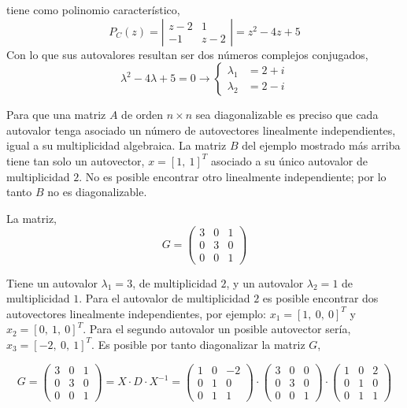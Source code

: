 tiene como polinomio característico,
\begin{equation*}
P_C(z)=\left\vert\begin{matrix}
z-2& 1\\
-1& z-2 
\end{matrix} \right\vert=z^2-4z+5
\end{equation*}
Con lo que sus autovalores resultan ser dos números complejos conjugados,
\begin{equation*}
\lambda^2-4\lambda+5=0 \rightarrow \left\{ 
\begin{aligned}
\lambda_1&=2+i\\
\lambda_2&=2-i
\end{aligned}
\right.
\end{equation*}

Para que una matriz $A$ de orden $n\times n$ sea diagonalizable es preciso que cada autovalor tenga asociado un número de autovectores linealmente independientes, igual a su multiplicidad algebraica. La matriz $B$ del ejemplo mostrado más arriba tiene tan solo un autovector, $x=[1,\ 1]^T$ asociado a su único autovalor de multiplicidad $2$. No es posible encontrar otro linealmente independiente; por lo tanto $B$ no es diagonalizable. 

La matriz, 
\begin{equation*}
G=\begin{pmatrix}
3& 0& 1\\
0& 3& 0\\
0& 0& 1
\end{pmatrix}
\end{equation*}

Tiene un autovalor $\lambda_1=3$, de multiplicidad $2$, y un autovalor $\lambda_2=1$ de multiplicidad $1$. Para el autovalor de multiplicidad $2$ es posible encontrar dos autovectores linealmente independientes, por ejemplo: $x_1=[1,\ 0,\ 0]^T$ y $x_2=[0,\ 1,\ 0]^T$. Para el segundo autovalor un posible autovector sería, $x_3=[-2,\ 0,\ 1]^T$. Es posible por tanto diagonalizar la matriz $G$,

\begin{equation*}
G=\begin{pmatrix}
3& 0& 1\\
0& 3& 0\\
0& 0& 1
\end{pmatrix}=X\cdot D \cdot X^{-1}=\begin{pmatrix}
1& 0& -2\\
0& 1& 0\\
0& 1& 1
\end{pmatrix}\cdot\begin{pmatrix}
3& 0& 0\\
0& 3& 0\\
0& 0& 1
\end{pmatrix}\cdot \begin{pmatrix}
1& 0& 2\\
0& 1& 0\\
0& 1& 1
\end{pmatrix}
\end{equation*}

